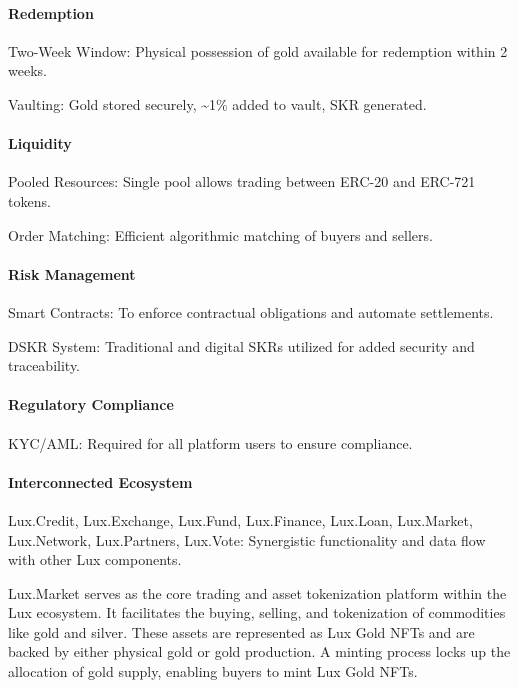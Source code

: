 \documentclass[11pt]{article}
\begin{document}
\paragraph{Redemption}

Two-Week Window: Physical possession of gold available for redemption within 2 weeks.


Vaulting: Gold stored securely, \textasciitilde{}1\% added to vault, SKR generated.


\paragraph{Liquidity}

Pooled Resources: Single pool allows trading between ERC-20 and ERC-721 tokens.


Order Matching: Efficient algorithmic matching of buyers and sellers.


\paragraph{Risk Management}

Smart Contracts: To enforce contractual obligations and automate settlements.


DSKR System: Traditional and digital SKRs utilized for added security and traceability.


\paragraph{Regulatory Compliance}

KYC/AML: Required for all platform users to ensure compliance.


\paragraph{Interconnected Ecosystem}

Lux.Credit, Lux.Exchange, Lux.Fund, Lux.Finance, Lux.Loan, Lux.Market, Lux.Network, Lux.Partners, Lux.Vote: Synergistic functionality and data flow with other Lux components.


Lux.Market serves as the core trading and asset tokenization platform within the Lux ecosystem. It facilitates the buying, selling, and tokenization of commodities like gold and silver. These assets are represented as Lux Gold NFTs and are backed by either physical gold or gold production. A minting process locks up the allocation of gold supply, enabling buyers to mint Lux Gold NFTs.
\end{document}
